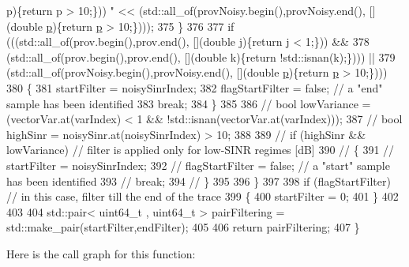 \begin{DoxyCode}
{       p)\{return p > 10;\})) "} << (std::all\_of(provNoisy.begin(),provNoisy.end(), [](\textcolor{keywordtype}{double} 
      \hyperlink{lte__link__budget_8m_ac9de518908a968428863f829398a4e62}{p})\{\textcolor{keywordflow}{return} \hyperlink{lte__link__budget_8m_ac9de518908a968428863f829398a4e62}{p} > 10;\})));
375                 \}
376 
377                 \textcolor{keywordflow}{if} (((std::all\_of(prov.begin(),prov.end(), [](\textcolor{keywordtype}{double} j)\{\textcolor{keywordflow}{return} j < 1;\})) && 
378                         (std::all\_of(prov.begin(),prov.end(), [](\textcolor{keywordtype}{double} k)\{\textcolor{keywordflow}{return} !std::isnan(k);\}))) || 
379                         (std::all\_of(provNoisy.begin(),provNoisy.end(), [](\textcolor{keywordtype}{double} 
      \hyperlink{lte__link__budget_8m_ac9de518908a968428863f829398a4e62}{p})\{\textcolor{keywordflow}{return} \hyperlink{lte__link__budget_8m_ac9de518908a968428863f829398a4e62}{p} > 10;\})))
380                 \{
381                         startFilter = noisySinrIndex;
382                         flagStartFilter = \textcolor{keyword}{false}; \textcolor{comment}{// a "end" sample has been identified}
383                         \textcolor{keywordflow}{break};
384                 \}
385                 
386                 \textcolor{comment}{// bool lowVariance = (vectorVar.at(varIndex) < 1 && !std::isnan(vectorVar.at(varIndex)));}
387                 \textcolor{comment}{// bool highSinr = noisySinr.at(noisySinrIndex) > 10;}
388 
389                 \textcolor{comment}{// if (highSinr && lowVariance)  // filter is applied only for low-SINR regimes [dB]}
390                 \textcolor{comment}{// \{}
391                 \textcolor{comment}{//      startFilter = noisySinrIndex;}
392                 \textcolor{comment}{//      flagStartFilter = false; // a "start" sample has been identified}
393                 \textcolor{comment}{//      break;}
394                 \textcolor{comment}{// \}}
395 
396         \}
397 
398         \textcolor{keywordflow}{if} (flagStartFilter) \textcolor{comment}{// in this case, filter till the end of the trace}
399         \{
400                 startFilter = 0;
401         \}
402 
403 
404         std::pair< uint64\_t , uint64\_t > pairFiltering = std::make\_pair(startFilter,endFilter);
405 
406         \textcolor{keywordflow}{return} pairFiltering;
407 \}
\end{DoxyCode}


Here is the call graph for this function\+:




